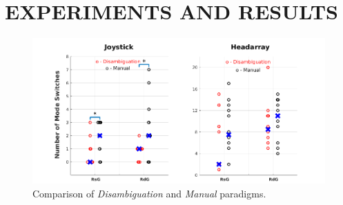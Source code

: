 \documentclass[conference]{IEEEtran}
\newcommand{\norm}[1]{\left\lVert#1\right\rVert}
\begin{document}
%
\section{EXPERIMENTS AND RESULTS} \label{EV}
\begin{figure}[t]
	\centering
	\includegraphics[width = 1.0\hsize,center]{./figures/MODE_2.png}
	\vspace{-0.4cm}
	\caption{Comparison of \textit{Disambiguation} and \textit{Manual} paradigms.}
	\label{DATAPLOT}
\end{figure}
\end{document}
